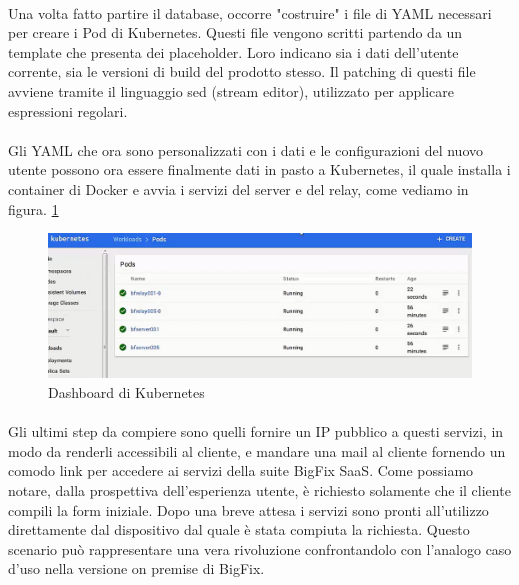 \paragraph{}
Una volta fatto partire il database, occorre "costruire" i file di YAML necessari per creare i Pod di Kubernetes. Questi file vengono scritti partendo da un template che presenta dei placeholder. Loro indicano sia i dati dell'utente corrente, sia le versioni di build del prodotto stesso. Il patching di questi file avviene tramite il linguaggio sed (stream editor), utilizzato per applicare espressioni regolari.
\paragraph{}
Gli YAML che ora sono personalizzati con i dati e le configurazioni del nuovo utente possono ora essere finalmente dati in pasto a Kubernetes, il quale installa i container di Docker e avvia i servizi del server e del relay, come vediamo in figura. \ref{fig:kubedashboard}
\begin{figure}[h]
	\centering
	\includegraphics[width=0.7\linewidth]{capitoli/imgs/kubedashboard}
	\caption{Dashboard di Kubernetes}
	\label{fig:kubedashboard}
\end{figure}
\paragraph{}
Gli ultimi step da compiere sono quelli fornire un IP pubblico a questi servizi, in modo da renderli accessibili al cliente, e mandare una mail al cliente fornendo un comodo link per accedere ai servizi della suite BigFix SaaS. Come possiamo notare, dalla prospettiva dell'esperienza utente, è richiesto solamente che il cliente compili la form iniziale. Dopo una breve attesa i servizi sono pronti all'utilizzo direttamente dal dispositivo dal quale è stata compiuta la richiesta. Questo scenario può rappresentare una vera rivoluzione confrontandolo con l'analogo caso d'uso nella versione on premise di BigFix.

